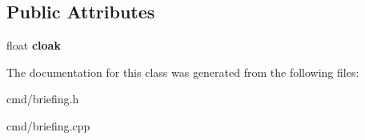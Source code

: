 \subsection*{Public Attributes}
\begin{DoxyCompactItemize}
\item 
float {\bfseries cloak}\hypertarget{classBriefing_1_1Ship_a60fa3d46218cf4d31ff225bf1f90b155}{}\label{classBriefing_1_1Ship_a60fa3d46218cf4d31ff225bf1f90b155}

\end{DoxyCompactItemize}


The documentation for this class was generated from the following files\+:\begin{DoxyCompactItemize}
\item 
cmd/briefing.\+h\item 
cmd/briefing.\+cpp\end{DoxyCompactItemize}

